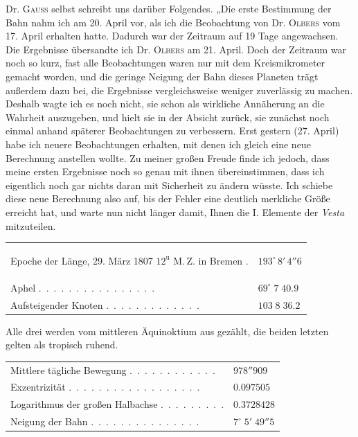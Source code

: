 \par\indent Dr. \textsc{Gauss} selbst schreibt uns darüber Folgendes. „Die erste Bestimmung der Bahn nahm ich am 20. April vor, als ich die Beobachtung von Dr. \textsc{Olbers} vom 17. April erhalten hatte. Dadurch war der Zeitraum auf 19 Tage angewachsen. Die Ergebnisse übersandte ich Dr. \textsc{Olbers} am 21. April. Doch der Zeitraum war noch so kurz, fast alle Beobachtungen waren nur mit dem Kreismikrometer gemacht worden, und die geringe Neigung der Bahn dieses Planeten trägt außerdem dazu bei, die Ergebnisse vergleichsweise weniger zuverlässig zu machen. Deshalb wagte ich es noch nicht, sie schon als wirkliche Annäherung an die Wahrheit auszugeben, und hielt sie in der Absicht zurück, sie zunächst noch einmal anhand späterer Beobachtungen zu verbessern. Erst gestern (27. April) habe ich neuere Beobachtungen erhalten, mit denen ich gleich eine neue Berechnung anstellen wollte. Zu meiner großen Freude finde ich jedoch, dass meine ersten Ergebnisse noch so genau mit ihnen übereinstimmen, dass ich eigentlich noch gar nichts daran mit Sicherheit zu ändern wüsste. Ich schiebe diese neue Berechnung also auf, bis der Fehler eine deutlich merkliche Größe erreicht hat, und warte nun nicht länger damit, Ihnen die I. Elemente der \emph{Vesta} mitzuteilen.

\begin{center}\begingroup\fontsize{9}{11}\selectfont
\begin{tabular}{ll}
\hypertarget{vesta1807-first-elements}{}\shortstack[l]{Epoche der Länge, 29. März 1807\\$12^{\text{u}}$ M.\,Z. in Bremen} . & $193^\circ\,8'\,4''6$ \\
Aphel .\ .\ .\ .\ .\ .\ .\ .\ .\ .\ .\ .\ .\ .\ .\ . & $69^\circ\;7\;40.9$ \\
Aufsteigender Knoten .\ .\ .\ .\ .\ .\ .\ .\ .\ .\ .\ .\ . & $103\;8\;36.2$
\end{tabular}\endgroup\end{center}

\noindent Alle drei werden vom mittleren Äquinoktium aus gezählt, die beiden letzten gelten als tropisch ruhend.

\begin{center}\begingroup\fontsize{9}{11}\selectfont
\begin{tabular}{ll}
Mittlere tägliche Bewegung .\ .\ .\ .\ .\ .\ .\ .\ .\ .\ .\ . & $978''909$ \\
Exzentrizität .\ .\ .\ .\ .\ .\ .\ .\ .\ .\ .\ .\ .\ .\ .\ .\ .\ . & $0.097505$ \\
Logarithmus der großen Halbachse .\ .\ .\ .\ .\ .\ .\ .\ . & $0.3728428$ \\
Neigung der Bahn .\ .\ .\ .\ .\ .\ .\ .\ .\ .\ .\ .\ .\ .\ . & $7^\circ\;5'\;49''5$
\end{tabular}\endgroup\end{center}

